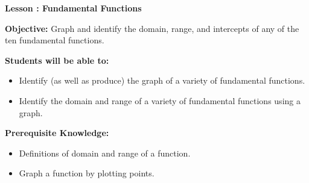 \documentclass[12pt]{article}
\theoremstyle{definition}
\begin{document}
{\bf \large Lesson : Fundamental Functions}\label{les:fundamental_functions}
\hfill \doclicenseImage[imagewidth=5em]\\
\par
{\bf Objective:} Graph and identify the domain, range, and intercepts of any of the ten fundamental functions.\\
\par
{\bf Students will be able to:}
\begin{itemize}
	\item Identify (as well as produce) the graph of a variety of fundamental functions.
	\item Identify the domain and range of a variety of fundamental functions using a graph.
\end{itemize}
{\bf Prerequisite Knowledge:}
\begin{itemize}
	\item Definitions of domain and range of a function.
	\item Graph a function by plotting points.
\end{itemize}
\hrulefill
\end{document}
